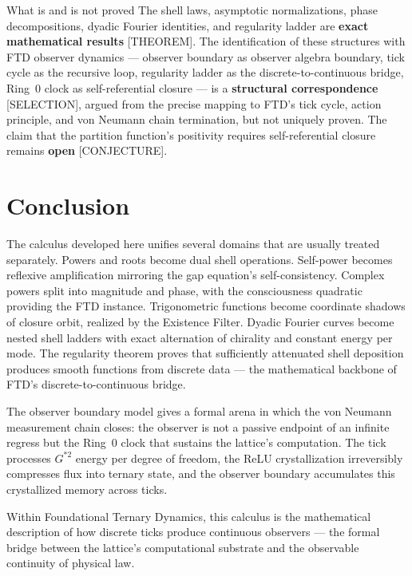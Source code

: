 \documentclass[11pt]{article}
\theoremstyle{tight}
\theoremstyle{plainroman}
\begin{document}
\begin{cautionbox}{What is and is not proved}
The shell laws, asymptotic normalizations, phase decompositions, dyadic Fourier identities, and regularity ladder are \textbf{exact mathematical results} [THEOREM].
The identification of these structures with FTD observer dynamics --- observer boundary as observer algebra boundary, tick cycle as the recursive loop, regularity ladder as the discrete-to-continuous bridge, Ring~0 clock as self-referential closure --- is a \textbf{structural correspondence} [SELECTION], argued from the precise mapping to FTD's tick cycle, action principle, and von Neumann chain termination, but not uniquely proven.
The claim that the partition function's positivity requires self-referential closure remains \textbf{open} [CONJECTURE].
\end{cautionbox}

\section{Conclusion}

The calculus developed here unifies several domains that are usually treated separately. Powers and roots become dual shell operations.
Self-power becomes reflexive amplification mirroring the gap equation's self-consistency.
Complex powers split into magnitude and phase, with the consciousness quadratic providing the FTD instance.
Trigonometric functions become coordinate shadows of closure orbit, realized by the Existence Filter.
Dyadic Fourier curves become nested shell ladders with exact alternation of chirality and constant energy per mode.
The regularity theorem proves that sufficiently attenuated shell deposition produces smooth functions from discrete data --- the mathematical backbone of FTD's discrete-to-continuous bridge.

The observer boundary model gives a formal arena in which the von Neumann measurement chain closes: the observer is not a passive endpoint of an infinite regress but the Ring~0 clock that sustains the lattice's computation.
The tick processes $G^{*2}$ energy per degree of freedom, the ReLU crystallization irreversibly compresses flux into ternary state, and the observer boundary accumulates this crystallized memory across ticks.

Within Foundational Ternary Dynamics, this calculus is the mathematical description of how discrete ticks produce continuous observers --- the formal bridge between the lattice's computational substrate and the observable continuity of physical law.
\end{document}
